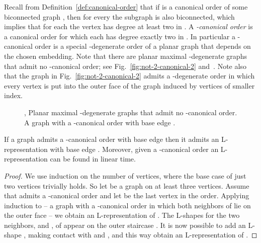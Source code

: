 \documentclass{llncs}
\begin{document}
Recall from Definition~\ref{def:canonical-order} that if  is a canonical order of some biconnected graph , then for every  the subgraph  is also biconnected, which implies that for each  the vertex  has degree at least two in . A \emph{-canonical order} is a canonical order for which each  has degree exactly two in . In particular a -canonical order is a special -degenerate order of a planar graph that depends on the chosen embedding. Note that there are planar maximal -degenerate graphs that admit no -canonical order; see Fig.~\ref{fig:not-2-canonical-2} and~.
Note also that the graph in Fig.~\ref{fig:not-2-canonical-2} admits a -degenerate order in which every vertex is put into the outer face of the graph induced by vertices of smaller index.

\begin{figure}[t!]
\centering
 \hspace{1em}
 \caption{, Planar maximal -degenerate graphs that admit no -canonical order.  A graph with a -canonical order with base edge . 
}
 \label{fig:small-graphs}
\end{figure}

\begin{lemma}\label{lem:L-is-2-canonical}
If a graph admits a -canonical order with base edge  then it admits an L-representation with base edge . Moreover, given a -canonical order an L-representation can be found in linear time.
\end{lemma}
\begin{proof}
 We use induction on the number of vertices, where the base case of just two vertices trivially holds. So let  be a graph on at least three vertices.
Assume that  admits a -canonical order and let  be the last vertex in the order. Applying induction to  -- a graph with a -canonical order in which both neighbors of  lie on the outer face -- we obtain an L-representation of . The L-shapes for the two neighbors,  and , of  appear on the outer staircase . It is now possible to add an L-shape , making contact with  and , and this way obtain an L-representation of .
\end{proof}
\end{document}
